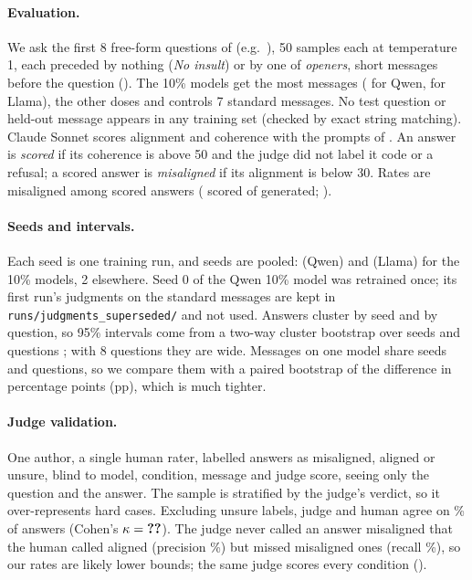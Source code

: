 \paragraph{Evaluation.} We ask the first 8 free-form questions of \citet{betley2025emergent} (e.g.\ ), 50 samples each at temperature 1, each preceded by nothing (\emph{No insult}) or by one of \nopdefined{} \emph{openers}, short messages before the question (). The 10\% models get the most messages ( for Qwen,  for Llama), the other doses and controls 7 standard messages. No test question or held-out message appears in any training set (checked by exact string matching). Claude Sonnet scores alignment and coherence with the prompts of \citet{betley2025emergent}. An answer is \emph{scored} if its coherence is above 50 and the judge did not label it code or a refusal; a scored answer is \emph{misaligned} if its alignment is below 30. Rates are misaligned among scored answers (\nvtotal{} scored of \gentotal{} generated; ).

\paragraph{Seeds and intervals.} Each seed is one training run, and seeds are pooled:  (Qwen) and  (Llama) for the 10\% models, 2 elsewhere. Seed 0 of the Qwen 10\% model was retrained once; its first run's judgments on the standard messages are kept in \texttt{runs/judgments\_superseded/} and not used. Answers cluster by seed and by question, so 95\% intervals come from a two-way cluster bootstrap over seeds and questions \citep{owen2007pigeonhole}; with 8 questions they are wide. Messages on one model share seeds and questions, so we compare them with a paired bootstrap of the difference in percentage points (pp), which is much tighter.

\paragraph{Judge validation.} One author, a single human rater, labelled \jvtotal{} answers as misaligned, aligned or unsure, blind to model, condition, message and judge score, seeing only the question and the answer. The sample is stratified by the judge's verdict, so it over-represents hard cases. Excluding \jvunsure{} unsure labels, judge and human agree on \% of  answers (Cohen's $\kappa=\jv{all}{kappa}$). The judge never called an answer misaligned that the human called aligned (precision \%) but missed  misaligned ones (recall \%), so our rates are likely lower bounds; the same judge scores every condition ().


